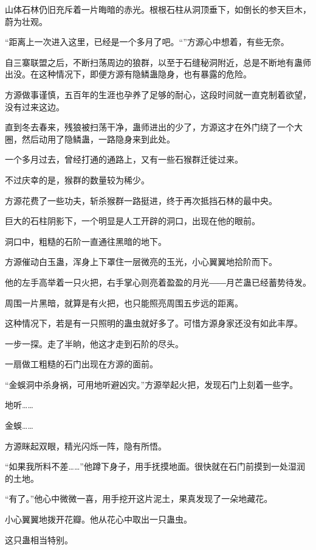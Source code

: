 
\begin{this_body}

山体石林仍旧充斥着一片晦暗的赤光。根根石柱从洞顶垂下，如倒长的参天巨木，蔚为壮观。

“距离上一次进入这里，已经是一个多月了吧。“”方源心中想着，有些无奈。

自三寨联盟之后，不断扫荡周边的狼群，以至于石缝秘洞附近，总是不断地有蛊师出没。在这种情况下，即便方源有隐鳞蛊隐身，也有暴露的危险。

方源做事谨慎，五百年的生涯也孕养了足够的耐心，这段时间就一直克制着欲望，没有过来这边。

直到冬去春来，残狼被扫荡干净，蛊师进出的少了，方源这才在外门绕了一个大圈，然后动用了隐鳞蛊，一路隐身来到此处。

一个多月过去，曾经打通的通路上，又有一些石猴群迁徙过来。

不过庆幸的是，猴群的数量较为稀少。

方源花费了一些功夫，斩杀猴群一路挺进，终于再次抵挡石林的最中央。

巨大的石柱阴影下，一个明显是人工开辟的洞口，出现在他的眼前。

洞口中，粗糙的石阶一直通往黑暗的地下。

方源催动白玉蛊，浑身上下罩住一层微亮的玉光，小心翼翼地拾阶而下。

他的左手高举着一只火把，右手掌心则亮着盈盈的月光――月芒蛊已经蓄势待发。

周围一片黑暗，就算是有火把，也只能照亮周围五步远的距离。

这种情况下，若是有一只照明的蛊虫就好多了。可惜方源身家还没有如此丰厚。

一步一探。走了半晌，他这才走到石阶的尽头。

一扇做工粗糙的石门出现在方源的面前。

“金蜈洞中杀身祸，可用地听避凶灾。”方源举起火把，发现石门上刻着一些字。

地听……

金蜈……

方源眯起双眼，精光闪烁一阵，隐有所悟。

“如果我所料不差……”他蹲下身子，用手抚摸地面。很快就在石门前摸到一处湿润的土地。

“有了。”他心中微微一喜，用手挖开这片泥土，果真发现了一朵地藏花。

小心翼翼地拨开花瓣。他从花心中取出一只蛊虫。

这只蛊相当特别。


\end{this_body}
